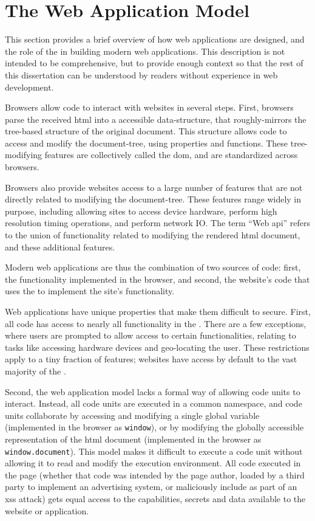 \section{The Web Application Model}
\label{background:web-application-model}

This section provides a brief overview of how web applications are designed,
and the role of the \WAPI in building modern web applications.
This description is not intended to be comprehensive, but to provide enough
context so that the rest of this dissertation can be understood
by readers without experience in web development.

Browsers allow \JS code to interact with websites in several steps. First,
browsers parse the received \gls{html} into a \JS accessible data-structure,
that roughly-mirrors the tree-based structure of the original document.
This structure allows \JS code to access and modify the document-tree,
using \JS properties and functions.  These tree-modifying \JS features are
collectively called the \gls{dom}, and are standardized across browsers.

Browsers also provide websites access to a large number of \JS features
that are not directly related to modifying the document-tree.  These
features range widely in purpose, including allowing sites to
access device hardware, perform high resolution timing operations, and
perform network IO.  The term ``Web \gls{api}'' refers to the union of
functionality related to modifying the rendered \gls{html} document, and
these additional \JS features.

Modern web applications are thus the combination of two sources of code:
first, the \WAPI functionality implemented in the browser, and second,
the website's \JS code that uses the \WAPI to implement the site's functionality.

Web applications have unique properties that make them difficult to secure.
First, all \JS code has access to nearly all functionality in the \WAPI.
There are a few exceptions, where users are
prompted to allow access to certain functionalities, relating
to tasks like accessing hardware devices and geo-locating the user.  These
restrictions apply to a tiny fraction of features; websites have
access by default to the vast majority of the \WAPI.

Second, the web application model lacks a formal
way of allowing code units to interact.  Instead, all code units are
executed in a common namespace, and code units collaborate by accessing and
modifying a single global variable (implemented in the browser as
\texttt{window}), or by modifying the globally accessible representation of the
\gls{html} document (implemented in the browser as \texttt{window.document}).
This model makes it difficult to execute a code unit without allowing
it to read and modify the execution environment.  All code executed in the
page (whether that code was intended by the page author, loaded by a third
party to implement an advertising system, or maliciously include as part of
an \gls{xss} attack) gets equal access to the capabilities, secrets and data
available to the website or application.

